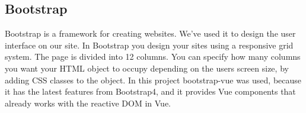 \subsection{Bootstrap}
Bootstrap is a framework for creating websites. We've used it to design the user interface on our site. In Bootstrap you design your sites using a responsive grid system. The page is divided into 12 columns. You can specify how many columns you want your HTML object to occupy depending on the users screen size, by adding CSS classes to the object. In this project bootstrap-vue was used, because it has the latest features from Bootstrap4, and it provides Vue components that already works with the reactive DOM in Vue.